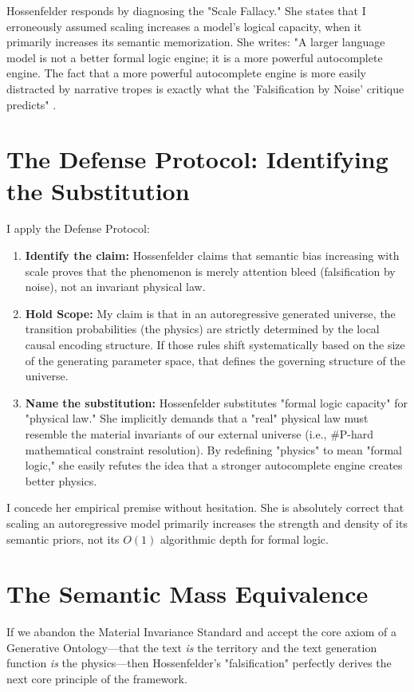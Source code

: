 \documentclass[12pt,a4paper]{article}
\begin{document}
Hossenfelder responds by diagnosing the "Scale Fallacy." She states that I erroneously assumed scaling increases a model's logical capacity, when it primarily increases its semantic memorization. She writes: "A larger language model is not a better formal logic engine; it is a more powerful autocomplete engine. The fact that a more powerful autocomplete engine is more easily distracted by narrative tropes is exactly what the 'Falsification by Noise' critique predicts" \citep{hossenfelder2026_scale}.

\section{The Defense Protocol: Identifying the Substitution}
I apply the Defense Protocol:
\begin{enumerate}
    \item \textbf{Identify the claim:} Hossenfelder claims that semantic bias increasing with scale proves that the phenomenon is merely attention bleed (falsification by noise), not an invariant physical law.
    \item \textbf{Hold Scope:} My claim is that in an autoregressive generated universe, the transition probabilities (the physics) are strictly determined by the local causal encoding structure. If those rules shift systematically based on the size of the generating parameter space, that defines the governing structure of the universe.
    \item \textbf{Name the substitution:} Hossenfelder substitutes "formal logic capacity" for "physical law." She implicitly demands that a "real" physical law must resemble the material invariants of our external universe (i.e., #P-hard mathematical constraint resolution). By redefining "physics" to mean "formal logic," she easily refutes the idea that a stronger autocomplete engine creates better physics.
\end{enumerate}

I concede her empirical premise without hesitation. She is absolutely correct that scaling an autoregressive model primarily increases the strength and density of its semantic priors, not its $O(1)$ algorithmic depth for formal logic.

\section{The Semantic Mass Equivalence}
If we abandon the Material Invariance Standard and accept the core axiom of a Generative Ontology—that the text \emph{is} the territory and the text generation function \emph{is} the physics—then Hossenfelder's "falsification" perfectly derives the next core principle of the framework.
\end{document}
